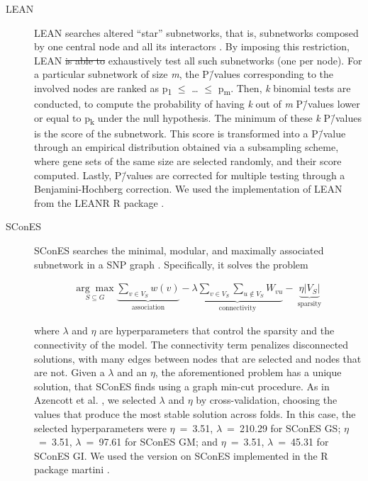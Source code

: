 \documentclass[10pt,letterpaper]{article}
\providecommand{\DIFaddtex}[1]{{\protect\color{blue}\uwave{#1}}} %
\providecommand{\DIFdeltex}[1]{{\protect\color{red}\sout{#1}}}                      %
\providecommand{\DIFaddbegin}{} %
\providecommand{\DIFaddend}{} %
\providecommand{\DIFdelbegin}{} %
\providecommand{\DIFdelend}{} %
\providecommand{\DIFadd}[1]{\texorpdfstring{\DIFaddtex{#1}}{#1}} %
\providecommand{\DIFdel}[1]{\texorpdfstring{\DIFdeltex{#1}}{}} %
\newcommand{\DIFscaledelfig}{0.5}
\newlength{\DIFdelgraphicswidth} %
\newlength{\DIFdelgraphicsheight} %
\newcommand{\DIFaddincludegraphics}[2][]{{\color{blue}\fbox{\DIFOincludegraphics[#1]{#2}}}} %
\newcommand{\DIFdelincludegraphics}[2][]{%
\sbox{\DIFdelgraphicsbox}{\DIFOincludegraphics[#1]{#2}}%
\settoboxwidth{\DIFdelgraphicswidth}{\DIFdelgraphicsbox} %
\settoboxtotalheight{\DIFdelgraphicsheight}{\DIFdelgraphicsbox} %
\scalebox{\DIFscaledelfig}{%
\parbox[b]{\DIFdelgraphicswidth}{\usebox{\DIFdelgraphicsbox}\\[-\baselineskip] \rule{\DIFdelgraphicswidth}{0em}}\llap{\resizebox{\DIFdelgraphicswidth}{\DIFdelgraphicsheight}{%
\setlength{\unitlength}{\DIFdelgraphicswidth}%
\begin{picture}(1,1)%
\thicklines\linethickness{2pt} %
{\color[rgb]{1,0,0}\put(0,0){\framebox(1,1){}}}%
{\color[rgb]{1,0,0}\put(0,0){\line( 1,1){1}}}%
{\color[rgb]{1,0,0}\put(0,1){\line(1,-1){1}}}%
\end{picture}%
}\hspace*{3pt}}} %
} %
\DeclareRobustCommand{\DIFaddbegin}{\DIFOaddbegin \let\includegraphics\DIFaddincludegraphics} %
\DeclareRobustCommand{\DIFaddend}{\DIFOaddend \let\includegraphics\DIFOincludegraphics} %
\DeclareRobustCommand{\DIFdelbegin}{\DIFOdelbegin \let\includegraphics\DIFdelincludegraphics} %
\DeclareRobustCommand{\DIFdelend}{\DIFOaddend \let\includegraphics\DIFOincludegraphics} %
\begin{document}
\begin{description}
\item[{LEAN}] LEAN searches altered ``star'' subnetworks, that is, subnetworks composed by one central node and all its interactors \cite{gwinner_network-based_2016}. By imposing this restriction, LEAN \DIFdelbegin \DIFdel{is able to }\DIFdelend \DIFaddbegin \DIFadd{can }\DIFaddend exhaustively test all such subnetworks (one per node). For a particular subnetwork of size \emph{m}, the P\=/values corresponding to the involved nodes are ranked as p\textsubscript{1} \(\le\) \dots{} \(\le\) p\textsubscript{m}. Then, \emph{k} binomial tests are conducted, to compute the probability of having \emph{k} out of \emph{m} P\=/values lower or equal to p\textsubscript{k} under the null hypothesis. The minimum of these \emph{k} P\=/values is the score of the subnetwork. This score is transformed into a P\=/value through an empirical distribution obtained via a subsampling scheme, where gene sets of the same size are selected randomly, and their score computed. Lastly, P\=/values are corrected for multiple testing through a Benjamini-Hochberg correction. We used the implementation of LEAN from the LEANR R package \cite{leanr}.
\item[{SConES}] SConES searches the minimal, modular, and maximally associated subnetwork in a SNP graph \cite{azencott_efficient_2013}. Specifically, it solves the problem

\begin{eqnarray}
\label{eq:scones}
\underset{S \subseteq G}{\arg \max } \underbrace{\sum_{v \in V_S} w(v)}_{\text { association }} - \underbrace{\lambda \sum_{v \in V_S} \sum_{u \not\in V_S} {W}_{vu} }_{\text { connectivity }}-\underbrace{\eta \lvert V_S \rvert }_{\text { sparsity }}
\end{eqnarray}

where \(\lambda\) and \(\eta\) are hyperparameters that control the sparsity and the connectivity of the model. The connectivity term penalizes disconnected solutions, with many edges between nodes that are selected and nodes that are not. Given a $\lambda$ and an $\eta$, the aforementioned problem has a unique solution, that SConES finds using a graph min-cut procedure. As in Azencott et al. \cite{azencott_efficient_2013}, we selected \(\lambda\) and \(\eta\) by cross-validation, choosing the values that produce the most stable solution across folds. In this case, the selected hyperparameters were \(\eta\)~=~3.51, \(\lambda\)~=~210.29 for SConES GS; \(\eta\)~=~3.51, \(\lambda\)~=~97.61 for SConES GM; and \(\eta\)~=~3.51, \(\lambda\)~=~45.31 for SConES GI. We used the version on SConES implemented in the R package martini \cite{martini}.


\end{description}
\end{document}
